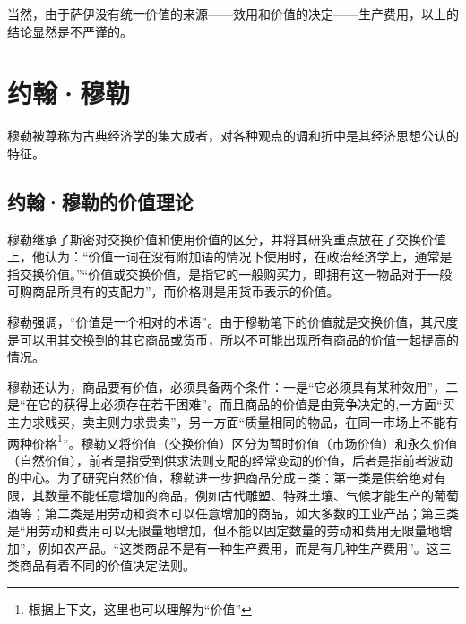 当然，由于萨伊没有统一价值的来源——效用和价值的决定——生产费用，以上的结论显然是不严谨的。

\section{约翰·穆勒}

 穆勒被尊称为古典经济学的集大成者，对各种观点的调和折中是其经济思想公认的特征\cite[165]{YanZhiJieXiFangJingJiXueShuoShiJiaoChengDiErBan2013}\cite[176-178]{CaiJiMingCongGuDianZhengZhiJingJiXueDaoZhongGuoTeSeSheHuiZhuYiZhengZhiJingJiXueJiYuZhongGuoShiJiaoDeZhengZhiJingJiXueYanBianShangCe2023}。
 
 \subsection{约翰·穆勒的价值理论}

 穆勒继承了斯密对交换价值和使用价值的区分，并将其研究重点放在了交换价值上，他认为：“价值一词在没有附加语的情况下使用时，在政治经济学上，通常是指交换价值。”\cite[492-493]{YueHan*MuLeZhengZhiJingJiXueYuanLiJiQiZaiSheHuiZheXueShangDeRuoGanYingYongShangJuan1991}“价值或交换价值，是指它的一般购买力，即拥有这一物品对于一般可购商品所具有的支配力”，而价格则是用货币表示的价值\cite[493]{YueHan*MuLeZhengZhiJingJiXueYuanLiJiQiZaiSheHuiZheXueShangDeRuoGanYingYongShangJuan1991}。

 穆勒强调，“价值是一个相对的术语”\cite[495]{YueHan*MuLeZhengZhiJingJiXueYuanLiJiQiZaiSheHuiZheXueShangDeRuoGanYingYongShangJuan1991}。由于穆勒笔下的价值就是交换价值，其尺度是可以用其交换到的其它商品或货币，所以不可能出现所有商品的价值一起提高的情况。

 穆勒还认为，商品要有价值，必须具备两个条件：一是“它必须具有某种效用”，二是“在它的获得上必须存在若干困难”\cite[499]{YueHan*MuLeZhengZhiJingJiXueYuanLiJiQiZaiSheHuiZheXueShangDeRuoGanYingYongShangJuan1991}。而且商品的价值是由竞争决定的,一方面“买主力求贱买，卖主则力求贵卖”，另一方面“质量相同的物品，在同一市场上不能有两种价格\footnote{根据上下文，这里也可以理解为“价值”}”\cite[497]{YueHan*MuLeZhengZhiJingJiXueYuanLiJiQiZaiSheHuiZheXueShangDeRuoGanYingYongShangJuan1991}。穆勒又将价值（交换价值）区分为暂时价值（市场价值）和永久价值（自然价值），前者是指受到供求法则支配的经常变动的价值，后者是指前者波动的中心\cite[2]{YueHan*MuLeZhengZhiJingJiXueYuanLiJiQiZaiSheHuiZheXueShangDeRuoGanYingYongXiaJuan1991}。为了研究自然价值，穆勒进一步把商品分成三类：第一类是供给绝对有限，其数量不能任意增加的商品，例如古代雕塑、特殊土壤、气候才能生产的葡萄酒等\cite[502]{YueHan*MuLeZhengZhiJingJiXueYuanLiJiQiZaiSheHuiZheXueShangDeRuoGanYingYongShangJuan1991}；第二类是用劳动和资本可以任意增加的商品，如大多数的工业产品\cite[502，532]{YueHan*MuLeZhengZhiJingJiXueYuanLiJiQiZaiSheHuiZheXueShangDeRuoGanYingYongShangJuan1991}；第三类是“用劳动和费用可以无限量地增加，但不能以固定数量的劳动和费用无限量地增加”，例如农产品\cite[502]{YueHan*MuLeZhengZhiJingJiXueYuanLiJiQiZaiSheHuiZheXueShangDeRuoGanYingYongShangJuan1991}。“这类商品不是有一种生产费用，而是有几种生产费用”\cite[532]{YueHan*MuLeZhengZhiJingJiXueYuanLiJiQiZaiSheHuiZheXueShangDeRuoGanYingYongShangJuan1991}。这三类商品有着不同的价值决定法则。

